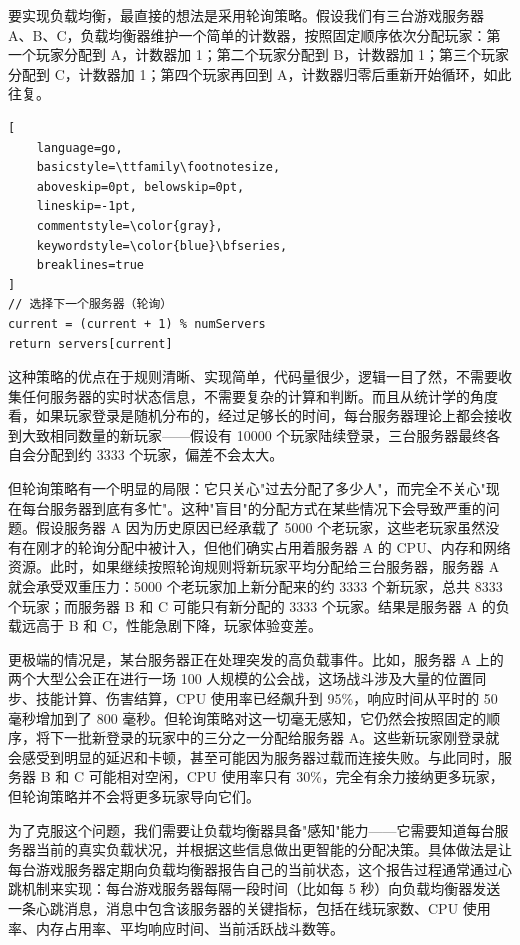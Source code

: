要实现负载均衡，最直接的想法是采用轮询策略。假设我们有三台游戏服务器 A、B、C，负载均衡器维护一个简单的计数器，按照固定顺序依次分配玩家：第一个玩家分配到 A，计数器加 1；第二个玩家分配到 B，计数器加 1；第三个玩家分配到 C，计数器加 1；第四个玩家再回到 A，计数器归零后重新开始循环，如此往复。

\begin{tcolorbox}[title=轮询策略的核心逻辑]
\begin{lstlisting}[
    language=go,
    basicstyle=\ttfamily\footnotesize,
    aboveskip=0pt, belowskip=0pt,
    lineskip=-1pt,
    commentstyle=\color{gray},
    keywordstyle=\color{blue}\bfseries,
    breaklines=true
]
// 选择下一个服务器（轮询）
current = (current + 1) % numServers
return servers[current]
\end{lstlisting}
\end{tcolorbox}

这种策略的优点在于规则清晰、实现简单，代码量很少，逻辑一目了然，不需要收集任何服务器的实时状态信息，不需要复杂的计算和判断。而且从统计学的角度看，如果玩家登录是随机分布的，经过足够长的时间，每台服务器理论上都会接收到大致相同数量的新玩家——假设有 10000 个玩家陆续登录，三台服务器最终各自会分配到约 3333 个玩家，偏差不会太大。

但轮询策略有一个明显的局限：它只关心"过去分配了多少人"，而完全不关心"现在每台服务器到底有多忙"。这种"盲目"的分配方式在某些情况下会导致严重的问题。假设服务器 A 因为历史原因已经承载了 5000 个老玩家，这些老玩家虽然没有在刚才的轮询分配中被计入，但他们确实占用着服务器 A 的 CPU、内存和网络资源。此时，如果继续按照轮询规则将新玩家平均分配给三台服务器，服务器 A 就会承受双重压力：5000 个老玩家加上新分配来的约 3333 个新玩家，总共 8333 个玩家；而服务器 B 和 C 可能只有新分配的 3333 个玩家。结果是服务器 A 的负载远高于 B 和 C，性能急剧下降，玩家体验变差。

更极端的情况是，某台服务器正在处理突发的高负载事件。比如，服务器 A 上的两个大型公会正在进行一场 100 人规模的公会战，这场战斗涉及大量的位置同步、技能计算、伤害结算，CPU 使用率已经飙升到 95\%，响应时间从平时的 50 毫秒增加到了 800 毫秒。但轮询策略对这一切毫无感知，它仍然会按照固定的顺序，将下一批新登录的玩家中的三分之一分配给服务器 A。这些新玩家刚登录就会感受到明显的延迟和卡顿，甚至可能因为服务器过载而连接失败。与此同时，服务器 B 和 C 可能相对空闲，CPU 使用率只有 30\%，完全有余力接纳更多玩家，但轮询策略并不会将更多玩家导向它们。

为了克服这个问题，我们需要让负载均衡器具备"感知"能力——它需要知道每台服务器当前的真实负载状况，并根据这些信息做出更智能的分配决策。具体做法是让每台游戏服务器定期向负载均衡器报告自己的当前状态，这个报告过程通常通过心跳机制来实现：每台游戏服务器每隔一段时间（比如每 5 秒）向负载均衡器发送一条心跳消息，消息中包含该服务器的关键指标，包括在线玩家数、CPU 使用率、内存占用率、平均响应时间、当前活跃战斗数等。

